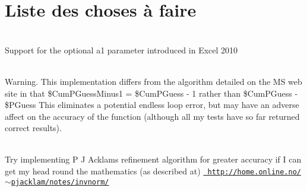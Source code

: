 \chapter{Liste des choses à faire}
\hypertarget{todo}{}\label{todo}

\begin{DoxyRefList}
\item[Membre \doxylink{class_php_office_1_1_php_spreadsheet_1_1_calculation_1_1_lookup_ref_a69a83ef45ce1def6132514b2bbad80c1}{Php\+Office\textbackslash{}Php\+Spreadsheet\textbackslash{}Calculation\textbackslash{}Lookup\+Ref\+::INDIRECT} (\$cell\+Address=null, \doxylink{namespace_php_office_1_1_php_spreadsheet_1_1_cell}{Cell} \$p\+Cell=null)]\hfill \\
\label{todo__todo000001}%
%
Support for the optional a1 parameter introduced in Excel 2010  
\item[Membre \doxylink{class_php_office_1_1_php_spreadsheet_1_1_calculation_1_1_statistical_af1e4151e5734bf8a41221aae346a6f01}{Php\+Office\textbackslash{}Php\+Spreadsheet\textbackslash{}Calculation\textbackslash{}Statistical\+::CRITBINOM} (\$trials, \$probability, \$alpha)]\hfill \\
\label{todo__todo000002}%
%
Warning. This implementation differs from the algorithm detailed on the MS web site in that \$\+Cum\+PGuess\+Minus1 = \$\+Cum\+PGuess -\/ 1 rather than \$\+Cum\+PGuess -\/ \$\+PGuess This eliminates a potential endless loop error, but may have an adverse affect on the accuracy of the function (although all my tests have so far returned correct results).  
\item[Membre \doxylink{class_php_office_1_1_php_spreadsheet_1_1_calculation_1_1_statistical_ae2135e1ffef076a1888996565b44bf90}{Php\+Office\textbackslash{}Php\+Spreadsheet\textbackslash{}Calculation\textbackslash{}Statistical\+::LOGINV} (\$probability, \$mean, \$std\+Dev)]\hfill \\
\label{todo__todo000003}%
%
Try implementing P J Acklam\textquotesingle{}s refinement algorithm for greater accuracy if I can get my head round the mathematics (as described at) \href{http://home.online.no/~pjacklam/notes/invnorm/}{\texttt{ http\+://home.\+online.\+no/\texorpdfstring{$\sim$}{\string~}pjacklam/notes/invnorm/}} 
\end{DoxyRefList}